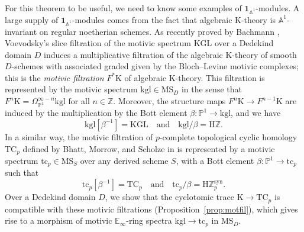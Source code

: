 \documentclass{amsart}
\numberwithin{equation}{section}
\theoremstyle{plain}
\theoremstyle{definition}
\let\bb=\mathbb
\def\Z{\bb Z}
\def\A{\bb A}
\def\P{\bb P}
\def\1{\mathbf 1}
\def\HH{\mathrm{H}}
\def\E{\mathbb{E}}
\def\KGL{\mathrm{KGL}}
\def\K{\mathrm{K}{}}
\def\MS{\mathrm{MS}}
\newcommand{\TC}{\mathrm{TC}}
\newcommand{\kgl}{\mathrm{kgl}}
\newcommand{\syn}{\mathrm{syn}}
\newcommand{\tc}{\mathrm{tc}}
\begin{document}
For this theorem to be useful, we need to know some examples of $\1_{\A^1}$-modules. 
A large supply of $\1_{\A^1}$-modules comes from the fact that algebraic K-theory is $\A^1$-invariant on regular noetherian schemes.
As recently proved by Bachmann \cite{Bac22}, Voevodsky's slice filtration of the motivic spectrum $\KGL$ over a Dedekind domain $D$ induces a multiplicative filtration of the algebraic K-theory of smooth $D$-schemes with associated graded given by the Bloch–Levine motivic complexes; this is the \emph{motivic filtration} $F^*\K$ of algebraic K-theory. This filtration is represented by the motivic spectrum $\kgl\in \MS_D$ in the sense that $F^n\K=\Omega^{\infty-n}_{\P^1}\kgl$ for all $n\in \Z$. Moreover, the structure maps $F^{n}\K\to F^{n-1}\K$ are induced by the multiplication by the Bott element $\beta\colon\P^1\to \kgl$, and we have
\[
\kgl[\beta^{-1}]=\KGL\quad\text{and}\quad \kgl/\beta=\HH\Z.
\]
In a similar way, the motivic filtration of $p$-complete topological cyclic homology $\TC_p$ defined by Bhatt, Morrow, and Scholze in \cite{BMS} is represented by a motivic spectrum $\tc_p\in \MS_S$ over any derived scheme $S$, with a Bott element $\beta\colon \P^1\to\tc_p$ such that
\[
\tc_p[\beta^{-1}]=\TC_p\quad\text{and}\quad \tc_p/\beta=\HH\Z_p^\syn.
\]
Over a Dedekind domain $D$, we show that the cyclotomic trace $\K\to \TC_p$ is compatible with these motivic filtrations (Proposition~\ref{prop:motfil}), which gives rise to a morphism of motivic $\E_\infty$-ring spectra $\kgl\to \tc_p$ in $\MS_D$.
\end{document}
